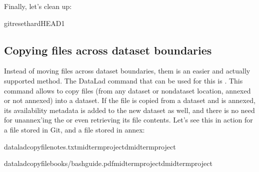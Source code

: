 \sphinxAtStartPar
Finally, let’s clean up:

\begin{sphinxVerbatim}[commandchars=\\\{\}]
gitreset\PYGZhy{}\PYGZhy{}hardHEAD\PYGZti{}1
\end{sphinxVerbatim}

\ignorespaces 

\subsection{Copying files across dataset boundaries}
\label{\detokenize{basics/101-136-filesystem:copying-files-across-dataset-boundaries}}\label{\detokenize{basics/101-136-filesystem:index-6}}\label{\detokenize{basics/101-136-filesystem:copyfilefs}}
\sphinxAtStartPar
Instead of moving files across dataset boundaries,  them is an easier
and actually supported method.
The DataLad command that can be used for this is .
This command allows to copy files
(from any dataset or non\sphinxhyphen{}dataset location, annexed or not annexed) into a dataset.
If the file is copied from a dataset and is annexed, its availability metadata
is added to the new dataset as well, and there is no need for unannex’ing the
or even retrieving its file contents. Let’s see this in action for a file
stored in Git, and a file stored in annex:

\begin{sphinxVerbatim}[commandchars=\\\{\}]
dataladcopy\PYGZhy{}filenotes.txtmidterm\PYGZus{}project\PYGZhy{}dmidterm\PYGZus{}project
\end{sphinxVerbatim}

\begin{sphinxVerbatim}[commandchars=\\\{\}]
dataladcopy\PYGZhy{}filebooks/bash\PYGZus{}guide.pdfmidterm\PYGZus{}project\PYGZhy{}dmidterm\PYGZus{}project
\end{sphinxVerbatim}


